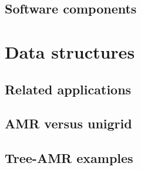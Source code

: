\documentclass{beamer}
\begin{document}





\subsection{Software components}


% 
% 
% 
% 
% 

\section{Data structures}

\subsection{Related applications}






\subsection{AMR versus unigrid}





\subsection{Tree-AMR examples}




\end{document}
